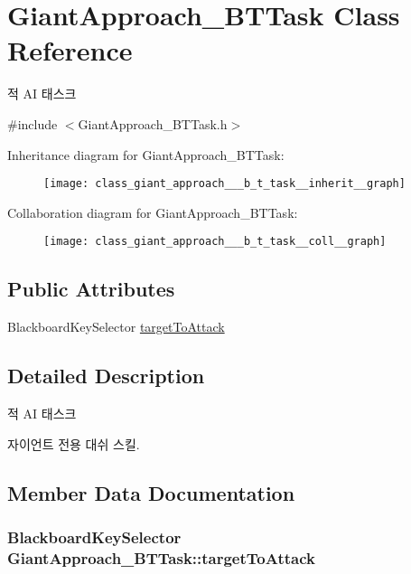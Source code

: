 \hypertarget{class_giant_approach___b_t_task}{}\section{Giant\+Approach\+\_\+\+B\+T\+Task Class Reference}
\label{class_giant_approach___b_t_task}


적 AI 태스크  




{\ttfamily \#include $<$Giant\+Approach\+\_\+\+B\+T\+Task.\+h$>$}



Inheritance diagram for Giant\+Approach\+\_\+\+B\+T\+Task\+:\nopagebreak
\begin{figure}[H]
\begin{center}
\leavevmode
\texttt{[image: class\_giant\_approach\_\_\_b\_t\_task\_\_inherit\_\_graph]}
\end{center}
\end{figure}


Collaboration diagram for Giant\+Approach\+\_\+\+B\+T\+Task\+:\nopagebreak
\begin{figure}[H]
\begin{center}
\leavevmode
\texttt{[image: class\_giant\_approach\_\_\_b\_t\_task\_\_coll\_\_graph]}
\end{center}
\end{figure}
\subsection*{Public Attributes}
\begin{DoxyCompactItemize}
\item 
Blackboard\+Key\+Selector \hyperlink{class_giant_approach___b_t_task_a6296d9126f5fc2e18266249e91090b18}{target\+To\+Attack}
\end{DoxyCompactItemize}


\subsection{Detailed Description}
적 AI 태스크 

자이언트 전용 대쉬 스킬. 

\subsection{Member Data Documentation}
\subsubsection[{\texorpdfstring{target\+To\+Attack}{targetToAttack}}]{\setlength{\rightskip}{0pt plus 5cm}Blackboard\+Key\+Selector Giant\+Approach\+\_\+\+B\+T\+Task\+::target\+To\+Attack}\hypertarget{class_giant_approach___b_t_task_a6296d9126f5fc2e18266249e91090b18}{}\label{class_giant_approach___b_t_task_a6296d9126f5fc2e18266249e91090b18}

